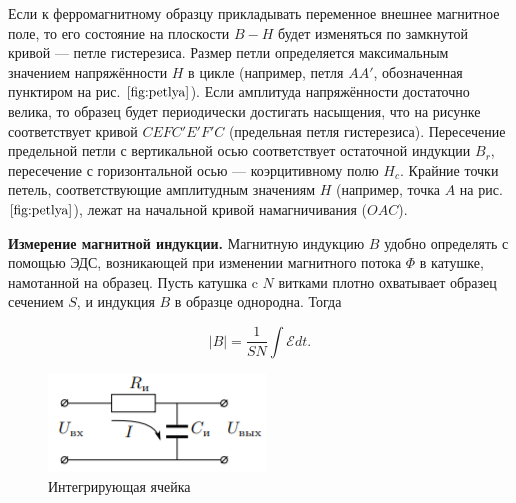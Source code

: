 \documentclass[a4paper,12pt]{article} %
\begin{document}
Если к ферромагнитному образцу прикладывать переменное внешнее
магнитное поле, то его состояние на плоскости $ B-H $ будет изменяться
по замкнутой кривой — петле гистерезиса. Размер петли определяется
максимальным значением напряжённости $ H $ в цикле (например, петля $ AA' $,
обозначенная пунктиром на рис. $\ref{fig:petlya}$). Если амплитуда напряжённости достаточно велика, то образец будет периодически достигать насыщения,
что на рисунке соответствует кривой $ CEFC'E'F'C $ (предельная петля
гистерезиса). Пересечение предельной петли с вертикальной осью соответствует остаточной индукции $B_r$, пересечение с горизонтальной осью
— коэрцитивному полю $H_c$. Крайние точки петель, соответствующие амплитудным значениям $ H $ (например, точка $ A $ на рис. $\ref{fig:petlya}$), лежат на начальной кривой намагничивания ($ OAC $).

\textbf{Измерение магнитной индукции.} Магнитную индукцию $ B $ удобно
определять с помощью ЭДС, возникающей при изменении магнитного
потока $ \Phi $ в катушке, намотанной на образец. Пусть катушка c $ N $ витками плотно охватывает образец сечением $ S $, и индукция $ B $ в образце
однородна. Тогда

\begin{equation}
|B|=\frac{1}{SN}\int\mathcal{E} dt.
\label{eq:|B|}
\end{equation}
\begin{figure}
	\includegraphics[width=\linewidth]{int.png}
	\caption{Интегрирующая ячейка}
	\label{fig:int}
\end{figure}
\end{document}
